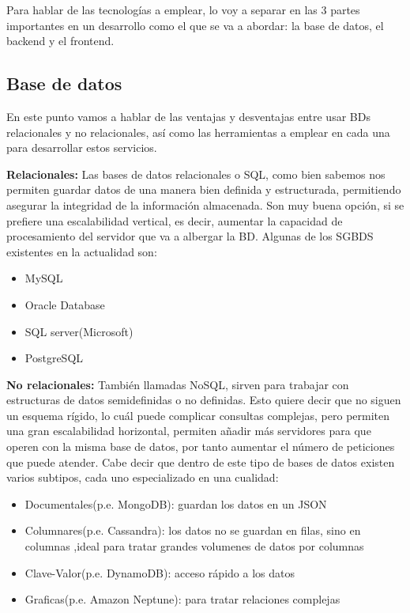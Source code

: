 Para hablar de las tecnologías a emplear, lo voy a separar en las 3 partes importantes en un desarrollo como el que se va a abordar: la base de datos, el backend y el frontend.

\subsection{Base de datos}

En este punto vamos a hablar de las ventajas y desventajas entre usar BDs relacionales y no relacionales, así como las herramientas a emplear en cada una para desarrollar estos servicios.

\textbf{Relacionales:} Las bases de datos relacionales o SQL, como bien sabemos nos permiten guardar datos de una manera bien definida y estructurada, permitiendo asegurar la integridad de la información almacenada. Son muy buena opción, si se prefiere una escalabilidad vertical, es decir, aumentar la capacidad de procesamiento del servidor que va a albergar la BD. Algunas de los SGBDS existentes en la actualidad son:

\begin{itemize}
	\item MySQL  %
	\item Oracle Database
	\item SQL server(Microsoft)
	\item PostgreSQL
\end{itemize}

\textbf{No relacionales:} También llamadas NoSQL, sirven para trabajar con estructuras de datos semidefinidas o no definidas. Esto quiere decir que no siguen un esquema rígido, lo cuál puede complicar consultas complejas, pero permiten una gran escalabilidad horizontal, permiten añadir más servidores para que operen con la misma base de datos, por tanto aumentar el número de peticiones que puede atender. Cabe decir que dentro de este tipo de bases de datos existen varios subtipos, cada uno especializado en una cualidad:

\begin{itemize}
	\item Documentales(p.e. MongoDB): guardan los datos en un JSON
	\item Columnares(p.e. Cassandra): los datos no se guardan en filas, sino en columnas ,ideal para tratar grandes volumenes de datos por columnas
	\item Clave-Valor(p.e. DynamoDB): acceso rápido a los datos
	\item Graficas(p.e. Amazon Neptune): para tratar relaciones complejas
\end{itemize}

